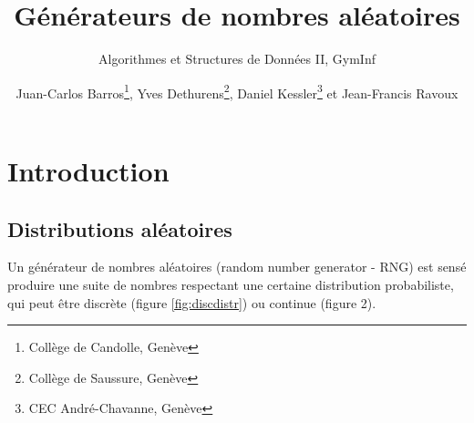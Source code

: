 \documentclass{scrartcl}
\title{Générateurs de nombres aléatoires}
\subtitle{Algorithmes et Structures de Données II, GymInf}
\author{Juan-Carlos Barros\footnote{Collège de Candolle, Genève}, Yves
  Dethurens\footnote{Collège de Saussure, Genève}, Daniel Kessler\footnote{CEC
    André-Chavanne, Genève} et Jean-Francis Ravoux\footnotemark[2]}
\begin{document}
\maketitle

\tableofcontents

\section{Introduction}\label{s:intro}

\subsection{Distributions aléatoires}
Un générateur de nombres aléatoires (random number generator - RNG) est sensé
produire une suite de nombres respectant une certaine distribution probabiliste,
qui peut être discrète (figure \ref{fig:discdistr}) ou continue (figure 2).
\end{document}
